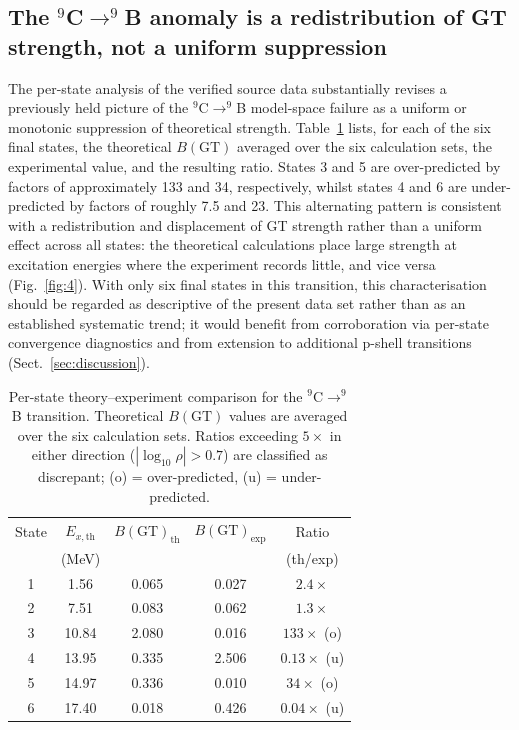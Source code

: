 \documentclass[10pt,twocolumn]{article}
\begin{document}
\subsection{The $^{9}$C$\rightarrow^{9}$B anomaly is a redistribution of GT strength, not a uniform suppression}
\label{sec:results-31}

The per-state analysis of the verified source data substantially revises a previously held picture of the $^{9}$C$\rightarrow^{9}$B model-space failure as a uniform or monotonic suppression of theoretical strength. Table~\ref{tab:1} lists, for each of the six final states, the theoretical $B(\mathrm{GT})$ averaged over the six calculation sets, the experimental value, and the resulting ratio. States 3 and 5 are over-predicted by factors of approximately 133 and 34, respectively, whilst states 4 and 6 are under-predicted by factors of roughly 7.5 and 23. This alternating pattern is consistent with a redistribution and displacement of GT strength rather than a uniform effect across all states: the theoretical calculations place large strength at excitation energies where the experiment records little, and vice versa (Fig.~\ref{fig:4}). With only six final states in this transition, this characterisation should be regarded as descriptive of the present data set rather than as an established systematic trend; it would benefit from corroboration via per-state convergence diagnostics and from extension to additional p-shell transitions (Sect.~\ref{sec:discussion}).

\begin{table}[htbp]
\centering
\caption{Per-state theory--experiment comparison for the $^{9}$C$\rightarrow^{9}$B transition. Theoretical $B(\mathrm{GT})$ values are averaged over the six calculation sets. Ratios exceeding $5\times$ in either direction ($|\log_{10}\rho| > 0.7$) are classified as discrepant; (o) = over-predicted, (u) = under-predicted.}
\label{tab:1}
\small
\setlength{\tabcolsep}{3pt}
\begin{tabular}{ccccc}
\toprule
State & $E_{x,\mathrm{th}}$ & $B(\mathrm{GT})_{\mathrm{th}}$ & $B(\mathrm{GT})_{\mathrm{exp}}$ & Ratio \\
 & (MeV) & & & (th/exp) \\
\midrule
1 & 1.56  & 0.065 & 0.027 & $2.4\times$ \\
2 & 7.51  & 0.083 & 0.062 & $1.3\times$ \\
3 & 10.84 & 2.080 & 0.016 & $133\times$ (o) \\
4 & 13.95 & 0.335 & 2.506 & $0.13\times$ (u) \\
5 & 14.97 & 0.336 & 0.010 & $34\times$ (o) \\
6 & 17.40 & 0.018 & 0.426 & $0.04\times$ (u) \\
\bottomrule
\end{tabular}
\end{table}
\end{document}
